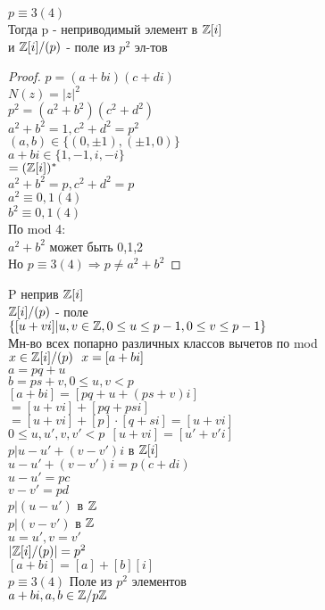 $ p \equiv 3(4) $ \\
Тогда p - неприводимый элемент в $ \mathbb{Z}[i] $ \\
и $ \mathbb{Z}[i] /(p) $ - поле из $p^2$ эл-тов \\
\begin{proof}
	$ p = (a+bi)(c + di)  $ \\
	$ N(z) = |z|^2 $ \\
	$ p^2 = (a^2 + b^2)(c^2 + d^2) $ \\
	$ a^2 + b^2 = 1, c^2 + d^2 = p^2 $ \\
	$ (a, b) \in \{(0, \pm 1), (\pm 1, 0) \} $ \\
	$ a + bi \in \{1, -1, i, -i\} $ \\
	$ = (\mathbb{Z}[i])^* $ \\
	$ a^2 + b^2 = p, c^2 + d^2 = p $ \\
	$ a^2 \equiv 0, 1 (4) $ \\
	$ b^2 \equiv 0, 1 (4) $ \\
	По mod 4: \\
	$ a^2 + b^2 $ может быть 0,1,2 \\
	Но $ p \equiv 3(4) \Rightarrow p \neq a^2 + b^2 $ 
\end{proof}

P неприв $ \mathbb{Z} [i] $ \\
$ \mathbb{Z} [i] / (p) $ - поле \\
$ \{ [u + vi] | u, v \in \mathbb{Z}, 0 \leq u \leq p-1, 0 \leq v \leq p-1 \}$ \\
Мн-во всех попарно различных классов вычетов по mod  \\
$ x \in \mathbb{Z}[i] /(p) \ \ x = [a + bi] $ \\
$ a = pq + u $ \\
$ b = ps + v, 0 \leq u,v < p $ \\
$ [a + bi] = [pq + u + (ps + v) i] $ \\
$ = [u+vi] + [pq + psi] $ \\
$ = [u+vi] + [p] \cdot [q+si] = [u+vi] $ \\
$ 0 \leq u, u', v, v' < p  \ \ [u + vi] = [u' + v'i] $ \\
$ p | u - u' + (v - v')i $ в $ \mathbb{Z} [i] $ \\
$ u - u' + ( v - v') i = p(c+di) $ \\
$ u - u' = pc $ \\
$ v - v' = pd $ \\
$ p | (u - u') $ в $ \mathbb{Z} $ \\
$ p | (v - v') $ в $ \mathbb{Z} $ \\
$ u = u', v = v' $ \\
$ | \mathbb{Z}[i] / (p) | = p^2 $ \\
$ [a + bi] = [a] + [b][i] $ \\
$ p \equiv 3 (4) $  Поле из $p^2$ элементов \\
$ a + bi, a, b \in \mathbb{Z} /p\mathbb{Z} $ 

